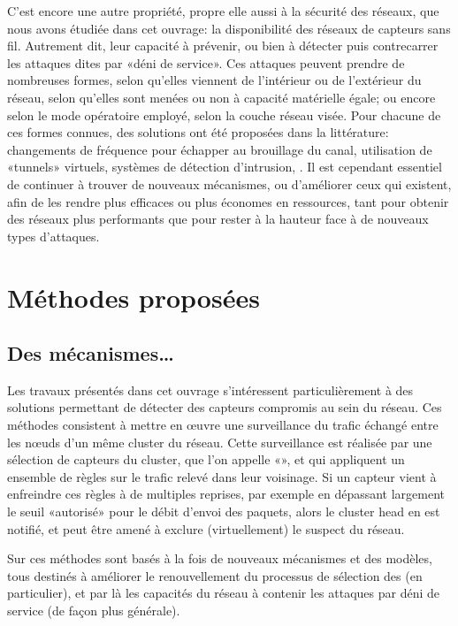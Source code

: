 C'est encore une autre propriété, propre elle aussi à la sécurité des réseaux, que nous avons étudiée dans cet ouvrage: la disponibilité des réseaux de capteurs sans fil.
Autrement dit, leur capacité à prévenir, ou bien à détecter puis contrecarrer les attaques dites par «déni de service».
Ces attaques peuvent prendre de nombreuses formes, selon qu'elles viennent de l'intérieur ou de l'extérieur du réseau, selon qu'elles sont menées ou non à capacité matérielle égale; ou encore selon le mode opératoire employé, selon la couche réseau visée.
Pour chacune de ces formes connues, des solutions ont été proposées dans la littérature: changements de fréquence pour échapper au brouillage du canal, utilisation de «tunnels» virtuels, systèmes de détection d'intrusion, \etc.
Il est cependant essentiel de continuer à trouver de nouveaux mécanismes, ou d'améliorer ceux qui existent, afin de les rendre plus efficaces ou plus économes en ressources, tant pour obtenir des réseaux plus performants que pour rester à la hauteur face à de nouveaux types d'attaques.

\section{Méthodes proposées}

    \subsection{Des mécanismes\dots}
Les travaux présentés dans cet ouvrage s'intéressent particulièrement à des solutions permettant de détecter des capteurs compromis au sein du réseau.
Ces méthodes consistent à mettre en œuvre une surveillance du trafic échangé entre les nœuds d'un même cluster du réseau.
Cette surveillance est réalisée par une sélection de capteurs du cluster, que l'on appelle «\cnst», et qui appliquent un ensemble de règles sur le trafic relevé dans leur voisinage.
Si un capteur vient à enfreindre ces règles à de multiples reprises, par exemple en dépassant largement le seuil «autorisé» pour le débit d'envoi des paquets, alors le cluster head en est notifié, et peut être amené à exclure (virtuellement) le suspect du réseau.

Sur ces méthodes sont basés à la fois de nouveaux mécanismes et des modèles, tous destinés à améliorer le renouvellement du processus de sélection des \cnst (en particulier), et par là les capacités du réseau à contenir les attaques par déni de service (de façon plus générale).

